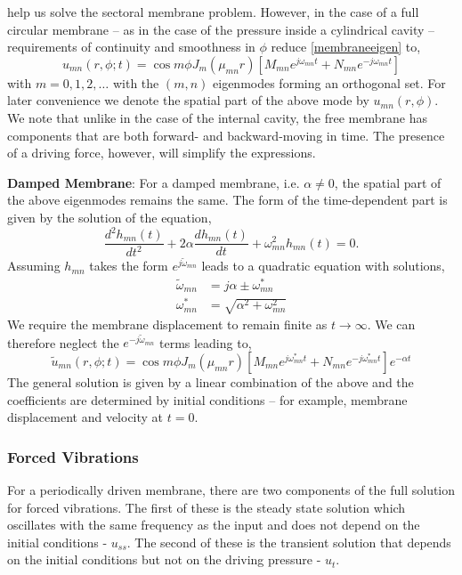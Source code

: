 help us solve the sectoral membrane problem. However, in the case of a full circular membrane -- as in the case
of the pressure inside a cylindrical cavity -- requirements of continuity and smoothness in $\phi$ reduce \eqref{membraneeigen}
to,
\begin{equation}\label{circularmembraneeigen}
 u_{mn}(r,\phi;t)=\cos m\phi J_m(\mu_{mn} r)\left[M_{mn}e^{j\omega_{mn} t}+N_{mn}e^{-j\omega_{mn} t}\right]
\end{equation}
with $m=0,1,2,\ldots$ with the $(m,n)$ eigenmodes forming an orthogonal set. For later convenience we denote the spatial
part of the above mode by $u_{mn}(r,\phi)$. We note that unlike in the case of the internal cavity, the free membrane has components
that are both forward- and backward-moving in time. The presence of a driving force, however, will simplify the expressions.

\vspace{\baselineskip}
\noindent\textbf{Damped Membrane}: For a damped membrane, i.e. $\alpha\neq 0$, the spatial part of the above eigenmodes remains the same. The form of the
time-dependent part is given by the solution of the equation,
\begin{equation}\label{dampedtimepart}
 \frac{d^2 h_{mn}(t)}{dt^2}+2\alpha \frac{d h_{mn}(t)}{dt}+\omega_{mn}^2h_{mn}(t)=0.
\end{equation}
Assuming $h_{mn}$ takes the form $e^{j\widetilde{\omega}_{mn}}$ leads to a quadratic equation with solutions,
\begin{align}
 \widetilde{\omega}_{mn}&=j\alpha\pm\omega_{mn}^*\\
 \omega_{mn}^*&=\sqrt{\alpha^2+\omega^2_{mn}}
\end{align}
We require the membrane displacement to remain finite as $t\rightarrow\infty$. We can therefore neglect the $e^{-j\widetilde{\omega}_{mn}}$ terms leading
to,
\begin{equation}\label{circularmembranedampedeigen}
 \widetilde{u}_{mn}(r,\phi;t)=\cos m\phi J_m(\mu_{mn} r)\left[M_{mn}e^{j\omega_{mn}^* t}+N_{mn}e^{-j\omega_{mn}^* t}\right]e^{-\alpha t}
\end{equation}
The general solution is given by a linear combination of the above and the coefficients are determined by initial conditions -- for example,
membrane displacement and velocity at $t=0$.
\subsubsection*{Forced Vibrations}
For a periodically driven membrane, there are two components of the full solution for forced vibrations. The first of these is the steady state solution which
oscillates with the same frequency as the input and does not depend on the initial conditions - $u_{ss}$. The second of these is the transient solution that depends
on the initial conditions but not on the driving pressure - $u_t$. 

